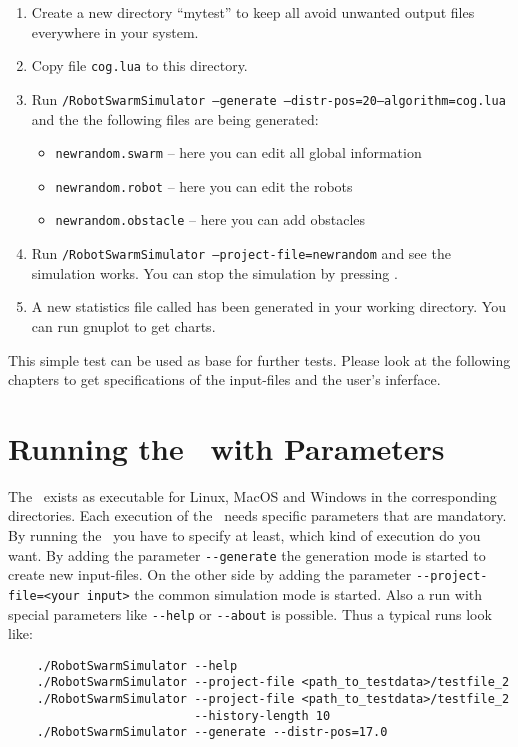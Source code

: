 \documentclass[a4paper,halfparskip,11pt,twoside]{scrartcl}
\begin{document}
\begin{enumerate}
	\item Create a new directory ``mytest'' to keep all avoid unwanted output files everywhere in your system.
	\item Copy file {\tt cog.lua} to this directory.
	\item Run {\tt <path to RSS>/RobotSwarmSimulator --generate --distr-pos=20\newline --algorithm=cog.lua} and the the following files are being generated:
	\begin{itemize}
		\item {\tt newrandom.swarm} -- here you can edit all global information
		\item {\tt newrandom.robot} -- here you can edit the robots
		\item {\tt newrandom.obstacle} -- here you can add obstacles
	\end{itemize}
	\item Run {\tt <path to RSS>/RobotSwarmSimulator --project-file=newrandom} and see the simulation works. You can stop the simulation by pressing .
	\item A new statistics file called  has been generated in your working directory. You can run gnuplot to get charts.
\end{enumerate}
This simple test can be used as base for further tests. Please look at the following chapters to get specifications of the input-files and the user's inferface.

\section{Running the \RSS\ with Parameters}

The \RSS\ exists as executable for Linux, MacOS and Windows in the corresponding directories. Each execution of the \RSS\ needs specific parameters that are mandatory. By running the \RSS\ you have to specify at least, which kind of execution do you want. By adding the parameter {\tt -{}-generate} the generation mode is started to create new input-files. On the other side by adding the parameter {\tt -{}-project-file=<your input>} the common simulation mode is started. Also a run with special parameters like {\tt-{}-help} or {\tt-{}-about} is possible. Thus a typical runs look like:
\begin{verbatim}
    ./RobotSwarmSimulator --help
    ./RobotSwarmSimulator --project-file <path_to_testdata>/testfile_2
    ./RobotSwarmSimulator --project-file <path_to_testdata>/testfile_2 
                          --history-length 10
    ./RobotSwarmSimulator --generate --distr-pos=17.0
\end{verbatim}
\end{document}
